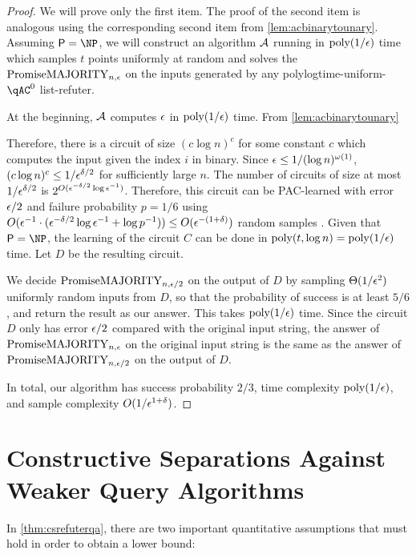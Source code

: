 \begin{proof}
    We will prove only the first item. The proof of the second item is analogous using the 
    corresponding second item from \cref{lem:acbinarytounary}.
    Assuming $\PTIME = \NP$, we will construct an algorithm $\mathcal{A}$ running in $\text{poly}(1/\epsilon)$ time
    which samples $t$ points uniformly at random and solves the $\mathrm{PromiseMAJORITY}_{n, \epsilon}$ on the
    inputs generated by any polylogtime-uniform-$\qAC^0$ list-refuter.

    At the beginning, $\mathcal{A}$ computes $\epsilon$ in $\text{poly}(1/\epsilon)$ time. 
    From \cref{lem:acbinarytounary} 

    Therefore, there is a circuit of size $(c \log n)^c$ for some constant $c$ which computes
    the input given the index $i$ in binary. Since $\epsilon \leq 1/(\log n)^{\omega(1)}$,
    $(c \log n)^c \leq 1/\epsilon^{\delta/2}$ for sufficiently large $n$. 
    The number of circuits of size at most $1/\epsilon^{\delta/2}$ is $2^{O(\epsilon^{-\delta/2} \log \epsilon^{-1})}$.
    Therefore, this circuit can be PAC-learned with error $\epsilon/2$ and failure probability 
    $p = 1/6$ using $O(\epsilon^{-1} \cdot (\epsilon^{-\delta/2} \log \epsilon^{-1} + \log p^{-1})) \leq O(\epsilon^{-(1+\delta)})$
    random samples \cite[Theorem 2.5]{Mohri18}. Given that $\PTIME = \NP$, the learning of the circuit 
    $C$ can be done in $\text{poly}(t, \log n) = \text{poly}(1/\epsilon)$ time. Let $D$ be the resulting circuit.

    We decide $\mathrm{PromiseMAJORITY}_{n, \epsilon/2}$ on the output of $D$ by sampling $\Theta(1/\epsilon^2)$ uniformly random
    inputs from $D$, so that the probability of success is at least $5/6$, and return the result 
    as our answer. This takes $\text{poly}(1/\epsilon)$ time. 
    Since the circuit $D$ only has error $\epsilon/2$ 
    compared with the original input string, the answer of $\mathrm{PromiseMAJORITY}_{n, \epsilon}$ on the original input
    string is the same as the answer of $\mathrm{PromiseMAJORITY}_{n, \epsilon/2}$ on the output of $D$.
    
    In total, our algorithm has success probability $2/3$, time complexity $\text{poly}(1/\epsilon)$, and 
    sample complexity $O(1/\epsilon^{1+\delta})$. 
\end{proof}

\section{Constructive Separations Against Weaker Query Algorithms}
\label{sec:refuteragainstweakerqa}

In \cref{thm:csrefuterqa}, there are two important quantitative assumptions
that must hold in order to obtain a lower bound:

